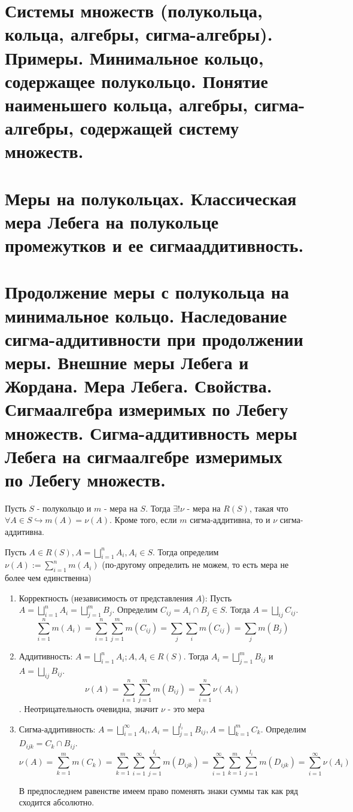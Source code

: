 \section{Системы множеств (полукольца, кольца, алгебры, сигма-алгебры). Примеры. Минимальное кольцо, содержащее полукольцо. Понятие наименьшего кольца, алгебры, сигма-алгебры, содержащей систему множеств.}


\newpage

\section{Меры на полукольцах. Классическая мера Лебега на полукольце промежутков и ее сигмааддитивность.}


\newpage

\section{Продолжение меры с полукольца на минимальное кольцо. Наследование сигма-аддитивности при продолжении меры. Внешние меры Лебега и Жордана. Мера Лебега. Свойства. Сигмаалгебра измеримых по Лебегу множеств. Сигма-аддитивность меры Лебега на сигмаалгебре измеримых по Лебегу множеств.}

\par \Th Пусть $S$ - полукольцо и $m$ - мера на $S$. Тогда $\exists! \nu$ - мера на $R(S)$, такая что $\forall A \in S \hookrightarrow m(A)=\nu(A)$. Кроме того, если $m$ сигма-аддитивна, то и $\nu$ сигма-аддитивна.
\par \Proof Пусть $A \in R(S), A=\bigsqcup_{i=1}^n A_i, A_i \in S$. Тогда определим $\nu(A):=\sum_{i=1}^n m(A_i)$ (по-другому определить не можем, то есть мера не более чем единственна)
\begin{enumerate}
    \item Корректность (независимость от представления $A$): Пусть $A=\bigsqcup_{i=1}^n A_i=\bigsqcup_{j=1}^m B_j$. Определим $C_{ij}=A_i \cap B_j \in S$. Тогда $A=\bigsqcup_{ij}C_{ij}$.
    $$\sum_{i=1}^n m(A_i)=\sum_{i=1}^n \sum_{j=1}^m m(C_{ij})=\sum_j \sum_i m(C_{ij})=\sum_j m(B_j)$$
    \item Аддитивность: $A=\bigsqcup_{i=1}^n A_i; A, A_i \in R(S)$. Тогда $A_i=\bigsqcup_{j=1}^m B_{ij}$ и $A=\bigsqcup_{ij} B_{ij}$. 
    $$\nu(A)=\sum_{i=1}^n \sum_{j=1}^m m(B_{ij})=\sum_{i=1}^n \nu(A_i)$$. Неотрицательность очевидна, значит $\nu$ - это мера
    \item Сигма-аддитивность: $A=\bigsqcup_{i=1}^\infty A_i,  A_i=\bigsqcup_{j=1}^{l_i} B_{ij}, A=\bigsqcup_{k=1}^m C_k$. Определим $D_{ijk}=C_k \cap B_{ij}$.
    $$\nu(A)=\sum_{k=1}^m m(C_k)=\sum_{k=1}^m \sum_{i=1}^\infty \sum_{j=1}^{l_i} m(D_{ijk})=\sum_{i=1}^\infty \sum_{k=1}^m \sum_{j=1}^{l_i} m(D_{ijk})=\sum_{i=1}^\infty \nu(A_i)$$
    \par В предпоследнем равенстве имеем право поменять знаки суммы так как ряд сходится абсолютно. \EndProof
\end{enumerate}

